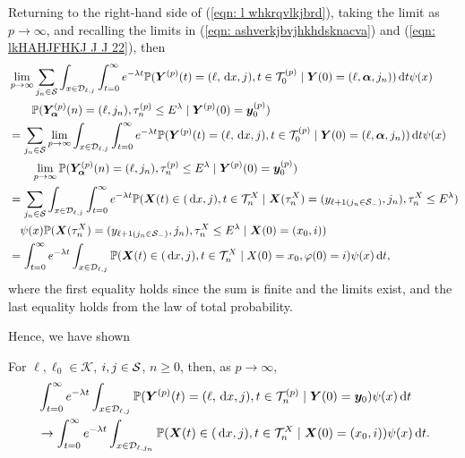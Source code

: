 Returning to the right-hand side of (\ref{eqn: l whkrqvlkjbrd}), taking the limit as \(p\to\infty\), and recalling the limits in (\ref{eqn: ashverkjbvjhkhdsknacva}) and (\ref{eqn: lkHAHJFHKJ J J 22}), then 
\begin{align}
	&\lim_{p\to\infty} \sum_{j_n\in\mathcal S}
	\int_{x\in\mathcal{D}_{\ell,j}} \int_{t=0}^\infty e^{-\lambda t} \mathbb P({\boldsymbol Y}^{(p)}(t) = (\ell,\, \mathrm{d} x, j), 
	t\in\mathcal T_0^{(p)} \mid \nonumber 
	\boldsymbol Y(0) = (\ell,\boldsymbol\alpha,j_n))\, \mathrm{d} t \psi(x)
	\\&\qquad{}  \mathbb P(\bm{Y}_{\bm{\alpha}}^{(p)}(n) = (\ell, j_n), \tau_{n}^{(p)}\leq E^\lambda 
	\mid \boldsymbol Y^{(p)}(0)=\boldsymbol y_0^{(p)}) \nonumber 
	\\&= \sum_{j_n\in\mathcal S}\lim_{p\to\infty}
	\int_{x\in\mathcal{D}_{\ell,j}} \int_{t=0}^\infty e^{-\lambda t} \mathbb P({\boldsymbol Y}^{(p)}(t) = (\ell,\, \mathrm{d} x, j), 
	t\in\mathcal T_0^{(p)} \mid \nonumber 
	\boldsymbol Y(0) = (\ell,\boldsymbol\alpha,j_n))\, \mathrm{d} t \psi(x)
	\\&\qquad{} \lim_{p\to\infty} \mathbb P(\bm{Y}_{\bm{\alpha}}^{(p)}(n) = (\ell, j_n), \tau_{n}^{(p)}\leq E^\lambda 
	\mid \boldsymbol Y^{(p)}(0)=\boldsymbol y_0^{(p)})\nonumber 
	\\&=\sum_{j_n\in\mathcal S}\int_{x\in\mathcal{D}_{\ell,j}} \int_{t=0}^\infty e^{-\lambda t} \mathbb P(\boldsymbol X(t)\in(\, \mathrm{d} x, j), t\in\mathcal T_n^{X} \mid \boldsymbol X(\tau_n^X) = (y_{\ell+1(j_n\in\mathcal S_-)}, j_n),\nonumber 
	\tau_n^X\leq E^\lambda ) 
	\\&\quad{} \psi(x)\mathbb P(\boldsymbol X(\tau_n^X) = (y_{\ell+1(j_{n}\in\mathcal S_-)}, 
	j_n), \tau_{n}^X\leq E^\lambda
	\mid \boldsymbol X(0)=(x_0,i))\nonumber
	\\&= \int_{t=0}^\infty e^{-\lambda t}  \int_{x\in\mathcal{D}_{\ell,j}}\mathbb P(\boldsymbol X(t)\in(\, \mathrm{d} x, j), t\in\mathcal T_n^{X} 
	\mid X(0)=x_0, \varphi(0)=i)\psi(x)\, \mathrm{d} t,
\end{align}
where the first equality holds since the sum is finite and the limits exist, and the last equality holds from the law of total probability. 

Hence, we have shown
\begin{lem}\label{lem: LAkAKFnvnb mav h}
	For \(\ell,\ell_0\in\mathcal K\), \(i,j\in\mathcal{S}\), \(n\geq 0\), then, as \(p\to\infty\), 
	\begin{align} 
		&\int_{t=0}^\infty e^{-\lambda t}\int_{x\in\mathcal{D}_{\ell,j}}\mathbb P({\boldsymbol Y}^{(p)}(t) = (\ell,\, \mathrm{d} x, j), t\in\mathcal T_n^{(p)} \mid  \nonumber 
		\boldsymbol Y(0) = \boldsymbol y_0)\psi(x)\, \mathrm{d} t \nonumber
		\\&\to\int_{t=0}^\infty e^{-\lambda t}  \int_{x\in\mathcal{D}_{\ell,j_n}}\mathbb P(\boldsymbol X(t)\in(\, \mathrm{d} x, j), t\in\mathcal T_n^{X} 
		\mid \boldsymbol X(0)=(x_0,i))\psi(x)\, \mathrm{d} t.
	\end{align}
\end{lem}

